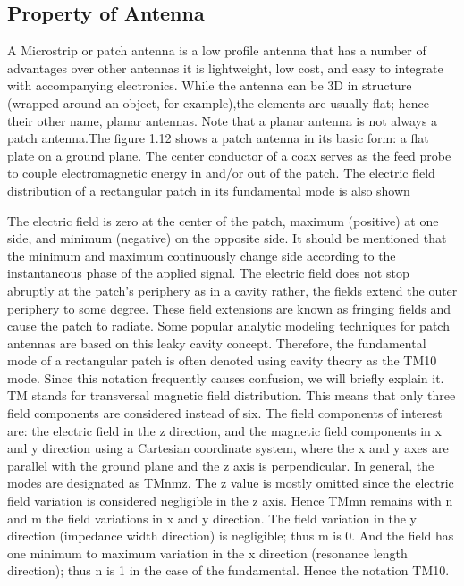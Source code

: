 \documentclass[12pt]{article}
\begin{document}
 \subsection{Property of Antenna}\label{sub:Property of Antenna}
  \justify
   A Microstrip or patch antenna is a low profile antenna that has a number of advantages  over other antennas it is lightweight, low cost, and easy to integrate with accompanying  electronics. While the antenna can be 3D in structure (wrapped around an object, for example),the elements are usually flat; hence their other name, planar antennas. Note that a planar antenna is not always a patch antenna.The figure 1.12 shows a patch antenna in its basic form: a flat plate on a ground plane. The center conductor of a coax serves as the feed probe to couple electromagnetic energy in and/or out of the patch. The electric field distribution of a rectangular patch in its fundamental mode is also shown

  \justify
   The electric field is zero at the center of the patch, maximum (positive) at one side, and minimum (negative) on the opposite side. It should be mentioned that the minimum and maximum continuously change side according to the instantaneous phase of the applied signal. The electric field does not stop abruptly at the patch's periphery as in a cavity rather, the fields extend the outer periphery to some degree. These field extensions are known as fringing fields and cause the patch to radiate. Some popular analytic modeling techniques for patch antennas are based on this leaky cavity concept. Therefore, the fundamental mode of a rectangular patch is often denoted using cavity theory as the TM10 mode.
 \justify
   Since this notation frequently causes confusion, we will briefly explain it. TM stands for transversal  magnetic field distribution. This means that only three field components are considered instead of six. The field components of interest are: the electric field in the z direction, and the magnetic field components in x and y direction using a Cartesian coordinate system, where the x and y axes are parallel with the ground plane and the z axis is perpendicular. In general, the modes are designated as TMnmz. The z value is mostly omitted since the electric field variation is considered negligible in the z axis. Hence TMmn remains with n and m the field variations in x and y direction. The field variation in the y direction (impedance width direction) is negligible; thus m is 0. And the field has one minimum to maximum variation in the x direction (resonance length direction); thus n is 1 in the case of the fundamental. Hence the notation TM10.
\end{document}
